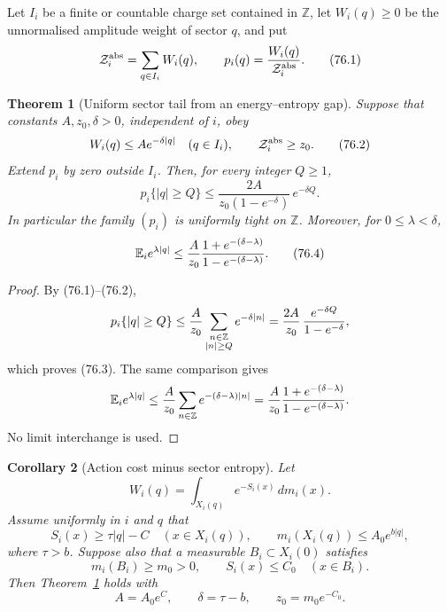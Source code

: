 \documentclass[11pt]{article}
\newtheorem{theorem}{Theorem}[section]
\newtheorem{corollary}[theorem]{Corollary}
\begin{document}
Let \(I_i\) be a finite or countable charge set contained in
\(\mathbb Z\), let \(W_i(q)\ge0\) be the unnormalised amplitude weight
of sector \(q\), and put
\[
                 {\cal Z}_i^{\rm abs}=\sum_{q\in I_i}W_i(q),
        \qquad
                 p_i(q)=\frac{W_i(q)}{{\cal Z}_i^{\rm abs}}.  \tag{76.1}
\]

\begin{theorem}[Uniform sector tail from an energy--entropy gap]
\label{thm:v11v76-tail}
Suppose that constants \(A,z_0,\delta>0\), independent of \(i\), obey
\[
 W_i(q)\le A e^{-\delta |q|}
 \quad(q\in I_i),\qquad
 {\cal Z}_i^{\rm abs}\ge z_0.                                \tag{76.2}
\]
Extend \(p_i\) by zero outside \(I_i\).  Then, for every integer
\(Q\ge1\),
\[
 p_i\{|q|\ge Q\}
 \le
 \frac{2A}{z_0(1-e^{-\delta})}\,e^{-\delta Q}.                \tag{76.3}
\]
In particular the family \((p_i)\) is uniformly tight on
\(\mathbb Z\).  Moreover, for \(0\le\lambda<\delta\),
\[
 \mathbb E_i e^{\lambda |q|}
 \le {A\over z_0}
       {1+e^{-(\delta-\lambda)}
        \over 1-e^{-(\delta-\lambda)}}.                       \tag{76.4}
\]
\end{theorem}

\begin{proof}
By (76.1)--(76.2),
\[
 p_i\{|q|\ge Q\}
 \le {A\over z_0}
       \sum_{\substack{n\in\mathbb Z\\ |n|\ge Q}}
             e^{-\delta |n|}
 = {2A\over z_0}\,{e^{-\delta Q}\over1-e^{-\delta}},
\]
which proves (76.3).  The same comparison gives
\[
 \mathbb E_i e^{\lambda |q|}
 \le {A\over z_0}\sum_{n\in\mathbb Z}
             e^{-(\delta-\lambda)|n|}
 = {A\over z_0}
       {1+e^{-(\delta-\lambda)}
        \over1-e^{-(\delta-\lambda)}}.
\]
No limit interchange is used.
\end{proof}

\begin{corollary}[Action cost minus sector entropy]
\label{cor:v11v76-energy-entropy}
Let
\[
 W_i(q)=\int_{X_i(q)}e^{-S_i(x)}\,dm_i(x).                    \tag{76.5}
\]
Assume uniformly in \(i\) and \(q\) that
\[
 S_i(x)\ge \tau |q|-C\quad(x\in X_i(q)),\qquad
 m_i(X_i(q))\le A_0e^{b|q|},                                 \tag{76.6}
\]
where \(\tau>b\).  Suppose also that a measurable
\(B_i\subset X_i(0)\) satisfies
\[
 m_i(B_i)\ge m_0>0,\qquad S_i(x)\le C_0\quad(x\in B_i).        \tag{76.7}
\]
Then Theorem~\ref{thm:v11v76-tail} holds with
\[
 A=A_0e^C,\qquad \delta=\tau-b,\qquad z_0=m_0e^{-C_0}.        \tag{76.8}
\]
\end{corollary}
\end{document}
